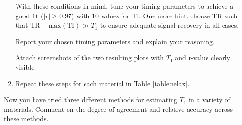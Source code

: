 \begin{enumerate}
    With these conditions in mind, tune your timing parameters to achieve a good fit ($|r| \geq 0.97$) with 10 values for TI. One more hint: choose TR such that $\text{TR} - \text{max}(\text{TI}) \gg T_1$ to ensure adequate signal recovery in all cases.
        
\color{red}
Report your chosen timing parameters and explain your reasoning.
\color{black}

\color{red}
Attach screenshots of the two resulting plots with $T_1$ and r-value clearly visible.
\color{black}

    \item   Repeat these steps for each material in Table \ref{table:relax}.

\end{enumerate}

\color{red}
Now you have tried three different methods for estimating $T_1$ in a variety of materials. Comment on the degree of agreement and relative accuracy across these methods.
\color{black}






